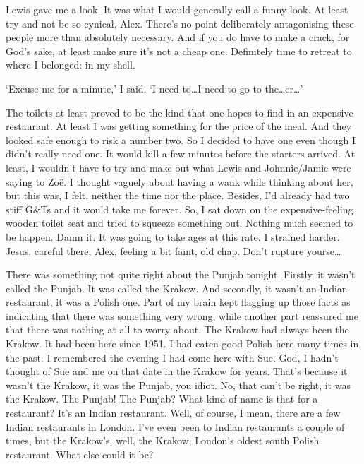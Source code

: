 Lewis gave me a look. It was what I would generally call a funny
look. At least try and not be so cynical, Alex.
There's no point {\twelveit deliberately\/} antagonising these
people more than absolutely necessary. And if you do have to make a
crack, for God's sake, at least make sure it's not a cheap one.
Definitely time to retreat to where I belonged: in my shell.

`Excuse me for a minute,' I said. `I need to\dots I need to go to the\dots er\dots'

The toilets at least proved to be the kind that one hopes to find in
an expensive restaurant. At least I was getting something for the
price of the meal. And they looked safe enough to risk a number two. So I decided to have one even though I didn't really
need one. It would kill a few minutes before the starters arrived.
At least, I wouldn't have to try and make out what Lewis and
Johnnie/Jamie were saying to Zo{\"e}. I thought vaguely about having
a wank while thinking about her, but this was, I felt, neither the
time nor the place. Besides, I'd already had two stiff G\&Ts and it
would take me {\twelveit forever}. So, I sat down on the
expensive-feeling wooden toilet seat and tried to squeeze something
out. Nothing much seemed to be happen. Damn it. It was going to take
ages at this rate. I strained harder. Jesus, careful there, Alex,
feeling a bit faint, old chap. Don't rupture yourse\dots

\vskip 1cm

{\parindent=0pt
There was something not quite right about the Punjab tonight.
Firstly, it wasn't called the Punjab. It was called the Krakow. And
secondly, it wasn't an Indian restaurant, it was a Polish one. Part of my brain kept flagging up those facts as indicating that there was
something very wrong, while another part reassured me that there
was nothing at all to worry about. The Krakow had always been the Krakow.
It had been here since 1951. I had eaten good Polish here many times in the past. I remembered the evening I had come here with Sue. God, I
hadn't thought of Sue and me on that date in the Krakow for years.
That's because it wasn't the Krakow, it was the Punjab, you idiot.
No, that can't be right, it was the Krakow. The Punjab! The Punjab?
What kind of name is that for a restaurant? It's an Indian
restaurant. Well, of course, I mean, there are a few Indian
restaurants in London. I've even been to Indian restaurants a couple
of times, but the Krakow's, well, the Krakow, London's oldest south Polish restaurant. What else could it be?}


